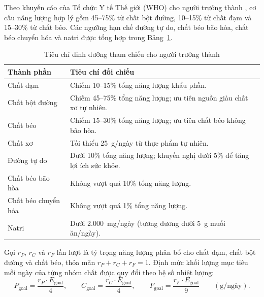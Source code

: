 Theo khuyến cáo của Tổ chức Y tế Thế giới (WHO) cho người trưởng thành \cite{whoHealthyDiets2024,whoCarbohydrate2023}, cơ cấu năng lượng hợp lý gồm 45--75\% từ chất bột đường, 10--15\% từ chất đạm và 15--30\% từ chất béo. Các ngưỡng hạn chế đường tự do, chất béo bão hòa, chất béo chuyển hóa và natri \cite{whoHealthyDiet,whoSodium2012} được tổng hợp trong Bảng~\ref{tab:nutrition-targets}.

\begin{table}[htbp]
    \centering
    \caption{Tiêu chí dinh dưỡng tham chiếu cho người trưởng thành}
    \label{tab:nutrition-targets}
    \begin{tabularx}{\textwidth}{@{}lX@{}}
        \toprule
        Thành phần & Tiêu chí đối chiếu \\
        \midrule
        Chất đạm & Chiếm 10--15\% tổng năng lượng khẩu phần. \\
        Chất bột đường & Chiếm 45--75\% tổng năng lượng; ưu tiên nguồn giàu chất xơ tự nhiên. \\
        Chất béo & Chiếm 15--30\% tổng năng lượng; ưu tiên chất béo không bão hòa. \\
        Chất xơ & Tối thiểu 25~g/ngày từ thực phẩm tự nhiên. \\
        Đường tự do & Dưới 10\% tổng năng lượng; khuyến nghị dưới 5\% để tăng lợi ích sức khỏe. \\
        Chất béo bão hòa & Không vượt quá 10\% tổng năng lượng. \\
        Chất béo chuyển hóa & Không vượt quá 1\% tổng năng lượng. \\
        Natri & Dưới 2.000~mg/ngày (tương đương dưới 5~g muối ăn/ngày). \\
        \bottomrule
    \end{tabularx}
\end{table}

Gọi $r_P$, $r_C$ và $r_F$ lần lượt là tỷ trọng năng lượng phân bổ cho chất đạm, chất bột đường và chất béo, thỏa mãn $r_P + r_C + r_F = 1$. Định mức khối lượng mục tiêu mỗi ngày của từng nhóm chất được quy đổi theo hệ số nhiệt lượng:
\begin{equation}
    P_{\mathrm{goal}} = \frac{r_P \cdot E_{\mathrm{goal}}}{4}, \qquad
    C_{\mathrm{goal}} = \frac{r_C \cdot E_{\mathrm{goal}}}{4}, \qquad
    F_{\mathrm{goal}} = \frac{r_F \cdot E_{\mathrm{goal}}}{9} \qquad (\mathrm{g/ngày}).
    \label{eq:macro-goals}
\end{equation}

